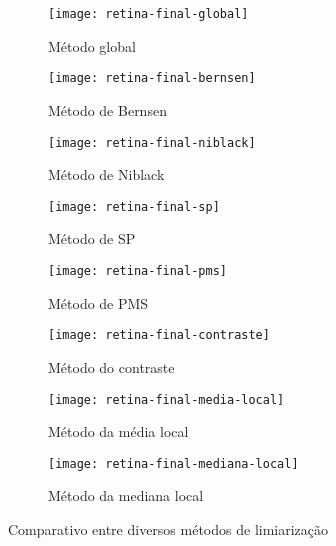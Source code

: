 \documentclass[brazilian,a4paper,twocolumn]{article}
\begin{document}
        \begin{figure}[H]
            \centering
            \begin{subfigure}{0.23\textwidth}
                \texttt{[image: retina-final-global]}
                \caption{Método global}
                \label{fig:retina-global}
            \end{subfigure}
            \begin{subfigure}{0.23\textwidth}
                \texttt{[image: retina-final-bernsen]}
                \caption{Método de Bernsen}
                \label{fig:retina-bernsen}
            \end{subfigure}
            \begin{subfigure}{0.23\textwidth}
                \texttt{[image: retina-final-niblack]}
                \caption{Método de Niblack}
                \label{fig:retina-niblack}
            \end{subfigure}
            \begin{subfigure}{0.23\textwidth}
                \texttt{[image: retina-final-sp]}
                \caption{Método de SP}
                \label{fig:retina-sp}
            \end{subfigure}
            \begin{subfigure}{0.23\textwidth}
                \texttt{[image: retina-final-pms]}
                \caption{Método de PMS}
                \label{fig:retina-pms}
            \end{subfigure}
            \begin{subfigure}{0.23\textwidth}
                \texttt{[image: retina-final-contraste]}
                \caption{Método do contraste}
                \label{fig:retina-contraste}
            \end{subfigure}
            \begin{subfigure}{0.23\textwidth}
                \texttt{[image: retina-final-media-local]}
                \caption{Método da média local}
                \label{fig:retina-media}
            \end{subfigure}
            \begin{subfigure}{0.23\textwidth}
                \texttt{[image: retina-final-mediana-local]}
                \caption{Método da mediana local}
                \label{fig:retina-mediana}
            \end{subfigure}

            \caption{Comparativo entre diversos métodos de limiarização}
            \label{fig:retina-limiarizacao}
        \end{figure}
\end{document}
